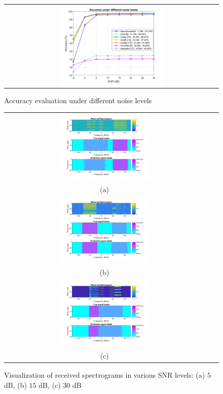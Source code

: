 \documentclass[journal]{IEEEtran} %
\begin{document}
\begin{figure}[!t]
    \centering
    \footnotesize
    \begin{tabular}{c}
        \includegraphics[width=0.5\textwidth]{img/accuracy_SNRs.jpg}
    \end{tabular}
    \caption{Accuracy evaluation under different noise levels}
    \label{fig6}
\end{figure}

\begin{figure}[!ht]
    \centering
    \footnotesize
    \begin{tabular}{ccc}
        \includegraphics[width=0.45\textwidth]{img/Visualization_5dB.jpg} \\ (a)\\  \includegraphics[width=0.45\textwidth]{img/Visualization_15dB.jpg} \\ (b)\\ 
        \includegraphics[width=0.45\textwidth]{img/Visualization_30dB.jpg} \\ (c)\\ 
    \end{tabular}
    \caption{Visualization of received spectrograms in various SNR levels: (a) $5$ dB, (b) $15$ dB, (c) $30$ dB}
    \label{fig7}
\end{figure}
\end{document}
